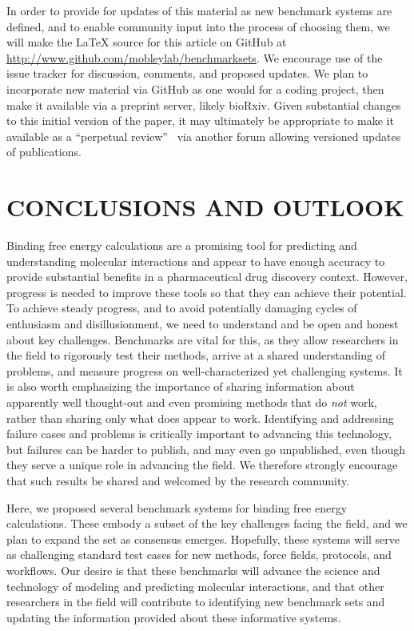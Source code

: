 \documentclass[aps,pre,twocolumn,nofootinbib,superscriptaddress,10pt, final,tightenlines]{revtex4-1}
\newcounter{comment}
\begin{document}
In order to provide for updates of this material as new benchmark systems are defined, and to enable community input into the process of choosing them, we will make the LaTeX source for this article on GitHub at \url{http://www.github.com/mobleylab/benchmarksets}. 
We encourage use of the issue tracker for discussion, comments, and proposed updates. We plan to incorporate new material via GitHub as one would for a coding project, then make it available via a preprint server, likely bioRxiv.
Given substantial changes to this initial version of the paper, it may ultimately be appropriate to make it available as a ``perpetual review''~\cite{mobley_proposal_2015} via another forum allowing versioned updates of publications. 

\section{CONCLUSIONS AND OUTLOOK}

Binding free energy calculations are a promising tool for predicting and understanding molecular interactions and appear to have enough accuracy to provide substantial benefits in a pharmaceutical drug discovery context.
However, progress is needed to improve these tools so that they can achieve their potential. To achieve steady progress, and to avoid potentially damaging cycles of enthusiasm and disillusionment, we need to understand and be open and honest about key challenges. 
Benchmarks are vital for this, as they allow researchers in the field to rigorously test their methods, arrive at a shared understanding of problems, and measure progress on well-characterized yet challenging systems. 
It is also worth emphasizing the importance of sharing information about apparently well thought-out and even promising methods that do \emph{not} work, rather than sharing only what does appear to work. 
Identifying and addressing failure cases and problems is critically important to advancing this technology, but failures can be harder to publish, and may even go unpublished, even though they serve a unique role in advancing the field. 
We therefore strongly encourage that such results be shared and welcomed by the research community.

Here, we proposed several benchmark systems for binding free energy calculations. 
These embody a subset of the key challenges facing the field, and we plan to expand the set as consensus emerges. 
Hopefully, these systems will serve as challenging standard test cases for new methods, force fields, protocols, and workflows. 
Our desire is that these benchmarks will advance the science and technology of modeling and predicting molecular interactions, and that other researchers in the field will contribute to identifying new benchmark sets and updating the information provided about these informative systems.
\end{document}
